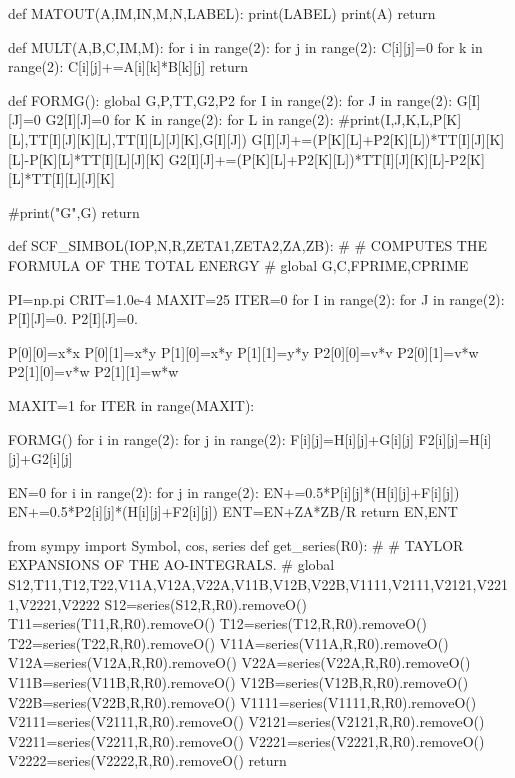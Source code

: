 def MATOUT(A,IM,IN,M,N,LABEL):
    print(LABEL)
    print(A)
    return

def MULT(A,B,C,IM,M):
    for i in range(2):
        for j in range(2):
            C[i][j]=0
            for k in range(2):
                C[i][j]+=A[i][k]*B[k][j]
    return 

def FORMG():
    global G,P,TT,G2,P2
    for I in range(2):
        for J in range(2):
            G[I][J]=0
            G2[I][J]=0
            for K in range(2):
                for L in range(2):
                    #print(I,J,K,L,P[K][L],TT[I][J][K][L],TT[I][L][J][K],G[I][J])
                    G[I][J]+=(P[K][L]+P2[K][L])*TT[I][J][K][L]-P[K][L]*TT[I][L][J][K]
                    G2[I][J]+=(P[K][L]+P2[K][L])*TT[I][J][K][L]-P2[K][L]*TT[I][L][J][K]

    #print("G",G)
    return 


def SCF_SIMBOL(IOP,N,R,ZETA1,ZETA2,ZA,ZB):
#
# COMPUTES THE FORMULA OF THE TOTAL ENERGY
#
    global G,C,FPRIME,CPRIME

    PI=np.pi
    CRIT=1.0e-4
    MAXIT=25
    ITER=0
    for I in range(2):
        for J in range(2):
            P[I][J]=0.
            P2[I][J]=0.

    P[0][0]=x*x
    P[0][1]=x*y
    P[1][0]=x*y
    P[1][1]=y*y
    P2[0][0]=v*v
    P2[0][1]=v*w
    P2[1][0]=v*w
    P2[1][1]=w*w
    
    MAXIT=1
    for ITER in range(MAXIT):
                
        FORMG()
        for i in range(2):
            for j in range(2):
                F[i][j]=H[i][j]+G[i][j]
                F2[i][j]=H[i][j]+G2[i][j]

        EN=0
        for i in range(2):
            for j in range(2):
                EN+=0.5*P[i][j]*(H[i][j]+F[i][j])
                EN+=0.5*P2[i][j]*(H[i][j]+F2[i][j])
    ENT=EN+ZA*ZB/R
    return EN,ENT


from sympy import Symbol, cos, series
def get_series(R0):
#
# TAYLOR EXPANSIONS OF THE AO-INTEGRALS.
#
    global S12,T11,T12,T22,V11A,V12A,V22A,V11B,V12B,V22B,V1111,V2111,V2121,V2211,V2221,V2222
    S12=series(S12,R,R0).removeO()
    T11=series(T11,R,R0).removeO()
    T12=series(T12,R,R0).removeO()
    T22=series(T22,R,R0).removeO()
    V11A=series(V11A,R,R0).removeO()
    V12A=series(V12A,R,R0).removeO()
    V22A=series(V22A,R,R0).removeO()
    V11B=series(V11B,R,R0).removeO()
    V12B=series(V12B,R,R0).removeO()
    V22B=series(V22B,R,R0).removeO()
    V1111=series(V1111,R,R0).removeO()
    V2111=series(V2111,R,R0).removeO()
    V2121=series(V2121,R,R0).removeO()
    V2211=series(V2211,R,R0).removeO()
    V2221=series(V2221,R,R0).removeO()
    V2222=series(V2222,R,R0).removeO()
    return
            


